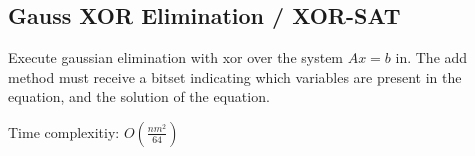 \subsection{Gauss XOR Elimination / XOR-SAT}

Execute gaussian elimination with xor over the system $Ax = b$ in. The add method must receive a bitset indicating which variables are present in the equation, and the solution of the equation.

Time complexitiy: $O(\frac{nm^{2}}{64})$
